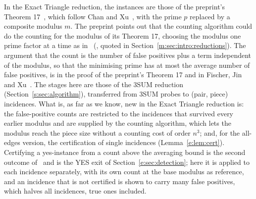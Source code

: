 \documentclass[11pt]{article}
\theoremstyle{definition}
\theoremstyle{remark}
\begin{document}
In the Exact Triangle reduction, the instances are those of the preprint's Theorem 17~\cite{ZT}, which follow Chan and Xu~\cite[Section~3]{CX24}, with the prime $p$ replaced by a composite modulus $m$. The preprint points out that the counting algorithm could do the counting for the modulus of its Theorem 17, choosing the modulus one prime factor at a time as in~\cite[Lemma~3.2]{FKP24} (\cite[footnote~9]{ZT}, quoted in Section~\ref{m:sec:intro:reductions}). The argument that the count is the number of false positives plus a term independent of the modulus, so that the minimising prime has at most the average number of false positives, is in the proof of the preprint's Theorem 17 and in Fischer, Jin and Xu~\cite[Lemma~3.2]{FJX25}. The stages here are those of the 3SUM reduction (Section~\ref{s:sec:algorithm}), transferred from 3SUM probes to (pair, piece) incidences. What is, as far as we know, new in the Exact Triangle reduction is: the false-positive counts are restricted to the incidences that survived every earlier modulus and are supplied by the counting algorithm, which lets the modulus reach the piece size without a counting cost of order $n^3$; and, for the all-edges version, the certification of single incidences (Lemma~\ref{e:lem:cert}). Certifying a yes-instance from a count above the averaging bound is the second outcome of~\cite[Lemma~3.2]{FKP24} and is the YES exit of Section~\ref{e:sec:detection}; here it is applied to each incidence separately, with its own count at the base modulus as reference, and an incidence that is not certified is shown to carry many false positives, which halves all incidences, true ones included.
\end{document}

